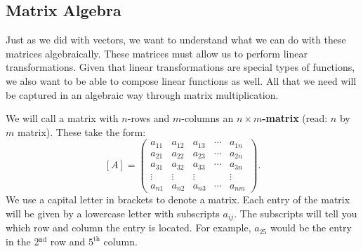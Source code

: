         \subsection{Matrix Algebra}
        Just as we did with vectors, we want to understand what we can do with these matrices algebraically.  These matrices must allow us to perform linear transformations.  Given that linear transformations are special types of functions, we also want to be able to compose linear functions as well.  All that we need will be captured in an algebraic way through matrix multiplication.  
        
        We will call a matrix with $n$-rows and $m$-columns an \textbf{$n\times m$-matrix} (read: $n$ by $m$ matrix).  These take the form:
        \[[A]=
        \begin{pmatrix}
        a_{11} & a_{12} & a_{13} & \cdots & a_{1n}\\
        a_{21} & a_{22} & a_{23} & \cdots & a_{2n}\\
        a_{31} & a_{32} & a_{33} & \cdots & a_{3n}\\
        \vdots & \vdots & \vdots & & \vdots \\
        a_{n1} & a_{n2} & a_{n3} & \cdots & a_{nm}
        \end{pmatrix}.
        \]
        We use a capital letter in brackets to denote a matrix. Each entry of the matrix will be given by a lowercase letter with subscripts $a_{ij}$.  The subscripts will tell you which row and column the entry is located. For example, $a_{25}$ would be the entry in the 2$^\textrm{nd}$ row and $5^\textrm{th}$ column.
        
